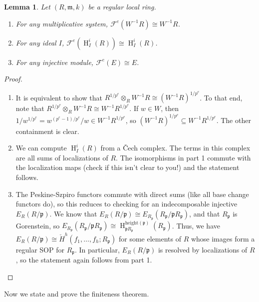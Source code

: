 \documentclass[11pt]{book}
\newtheorem{lemma}[theorem]{Lemma}
\numberwithin{equation}{section}
\numberwithin{theorem}{chapter}
\theoremstyle{definition}
\newtheorem*{basic properties}{Basic Properties}
\newtheorem*{Important Remark}{Important Remark}
\theoremstyle{remark}
\newcommand{\m}{\mathfrak{m}}
\newcommand{\p}{\mathfrak{p}}
\newcommand{\cF}{\mathcal{F}}
\renewcommand{\H}{\operatorname{H}}
\begin{document}
\begin{lemma}
	Let $(R,\m,k)$ be a regular local ring.
	\begin{enumerate}
		\item For any multiplicative system, $\cF^e(W^{-1}R)\cong W^{-1}R$.
		\item For any ideal $I$, $\cF^e(\H^i_I(R))\cong \H^i_I(R)$.
		\item For any injective module, $\cF^e(E)\cong E$.
	\end{enumerate}
\end{lemma}
\begin{proof} 
	\begin{enumerate}
		\item It is equivalent to show that $R^{1/p^e}\otimes_R W^{-1}R \cong (W^{-1}R)^{1/p^e}$. To that end, note that $R^{1/p^e} \otimes_R W^{-1}R \cong W^{-1} R^{1/p^e}$. If $w\in W$, then $1/w^{1/p^e}=w^{(p^e-1)/p^e}/w\in W^{-1} R^{1/p^e}$, so $(W^{-1} R)^{1/p^e}\subseteq W^{-1} R^{1/p^e}$. The other containment is clear.
		\item We can compute $\H^i_I(R)$ from a \v Cech complex. The terms in this complex are all sums of localizations of $R$. The isomorphisms in part 1 commute with the localization maps (check if this isn't clear to you!) and the statement follows.
		\item The Peskine-Szpiro functors commute with direct sums (like all base change functors do), so this reduces to checking for an indecomposable injective $E_R(R/\p)$. We know that $E_{R}(R/\p)\cong E_{R_\p}(R_\p / \p R_\p)$, and that $R_\p$ is Gorenstein, so $E_{R_\p}(R_\p / \p R_\p)\cong \H^{\mathrm{height}(\p )}_{\p R_\p}(R_\p)$. Thus, we have $E_R(R/\p)\cong \check{H}^h(f_1,\dots,f_h; R_{\p})$ for some elements of $R$ whose images form a regular SOP for $R_\p$. In particular, $E_R(R/\p)$ is resolved by localizations of $R$, so the statement again follows from part 1.\qedhere
	\end{enumerate}
\end{proof}

Now we state and prove the finiteness theorem.
\end{document}
